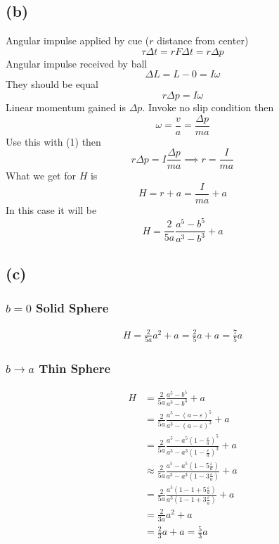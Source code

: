 \documentclass[letter, 10pts]{article}
\begin{document}
\subsection*{(b)} 
Angular impulse applied by cue ($r$ distance from center)
\[
\tau \Delta t = r F \Delta t = r \Delta p    
\] 
Angular impulse received by ball
\[
\Delta L = L - 0 = I \omega  
\] 
They should be equal 
\begin{equation}
r \Delta p = I \omega
\end{equation}
Linear momentum gained is $\Delta p$. Invoke no slip condition then 
\[
\omega = \frac{v}{a} = \frac{\Delta p}{m a}
\] 
Use this with (1) then 
\[
r \Delta p = I \frac{\Delta p}{m a} \implies r = \frac{I}{ma}
\] 
What we get for $H$ is 
\[
H = r + a = \frac{I}{ma} + a
\] 
In this case it will be 
\[
H = \frac{2}{5 a} \frac{a^{5} - b^{5}}{a^{3} - b^{3}} + a  
\] 



\subsection*{(c)} 
\subsubsection*{$b = 0$ Solid Sphere} 
\begin{align*}
H = \frac{2}{5 a} a^2 + a = \frac{2}{5} a + a = \frac{7}{5} a   
\end{align*}

\subsubsection*{$b \to  a$ Thin Sphere} 
\begin{align*}
	H &= \frac{2}{5 a} \frac{a^{5} - b^{5}}{a^{3} - b^{3}} + a \\  
	  &=
	\frac{2}{5 a} \frac{a^{5} - (a - \varepsilon)^{5}}{a^{3} - (a - \varepsilon)^{3}} + a   \\
	  &=
	\frac{2}{5 a} \frac{a^{5} - a^{5}(1 - \frac{\varepsilon}{a})^{5}}{a^{3} - a^{3}(1 - \frac{\varepsilon}{a})^{3}} + a   \\
	  &\approx 
	\frac{2}{5 a} \frac{a^{5} - a^{5}(1 -5\frac{\varepsilon}{a})}{a^{3} - a^{3}(1 - 3\frac{\varepsilon}{a})} + a   \\
	  &= 
	\frac{2}{5 a} \frac{a^{5} ( 1 - 1 +5\frac{\varepsilon}{a})}{a^{3} (1 - 1 + 3\frac{\varepsilon}{a})} + a   \\
	  &= 
  \frac{2}{3 a} {a^{2}} + a 
 \\ 
& = 
\frac{2}{3} a + a = \frac{5}{3} a  
\end{align*}
\end{document}
